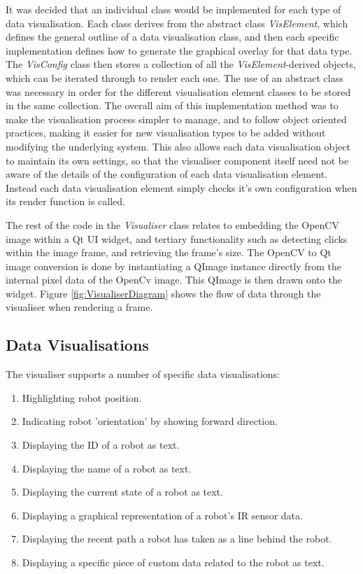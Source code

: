 It was decided that an individual class would be implemented for each type of data visualisation. Each class derives from the abstract class \textit{VisElement}, which defines the general outline of a data visualisation class, and then each specific implementation defines how to generate the graphical overlay for that data type. The \textit{VisConfig} class then stores a collection of all the \textit{VisElement}-derived objects, which can be iterated through to render each one. The use of an abstract class was necessary in order for the different visualisation element classes to be stored in the same collection. The overall aim of this implementation method was to make the visualisation process simpler to manage, and to follow object oriented practices, making it easier for new visualisation types to be added without modifying the underlying system. This also allows each data visualisation object to maintain its own settings, so that the visualiser component itself need not be aware of the details of the configuration of each data visualisation element. Instead each data visualisation element simply checks it's own configuration when its render function is called.

The rest of the code in the \textit{Visualiser} class relates to embedding the OpenCV image within a Qt UI widget, and tertiary functionality such as detecting clicks within the image frame, and retrieving the frame's size. The OpenCV to Qt image conversion is done by instantiating a QImage instance directly from the internal pixel data of the OpenCv image. This QImage is then drawn onto the widget. Figure \ref{fig:VisualiserDiagram} shows the flow of data through the visualiser when rendering a frame.

\subsection{Data Visualisations}
The visualiser supports a number of specific data visualisations:

\begin{enumerate}
 \item Highlighting robot position.
 \item Indicating robot 'orientation' by showing forward direction.
 \item Displaying the ID of a robot as text.
 \item Displaying the name of a robot as text.
 \item Displaying the current state of a robot as text.
 \item Displaying a graphical representation of a robot's IR sensor data.
 \item Displaying the recent path a robot has taken as a line behind the robot.
 \item Displaying a specific piece of custom data related to the robot as text.
\end{enumerate}

